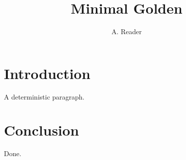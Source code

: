 \documentclass{article}
\title{Minimal Golden}
\author{A. Reader}
\begin{document}
\maketitle
\section{Introduction}\label{sec:intro}
A deterministic paragraph.
\section{Conclusion}
Done.
\end{document}
